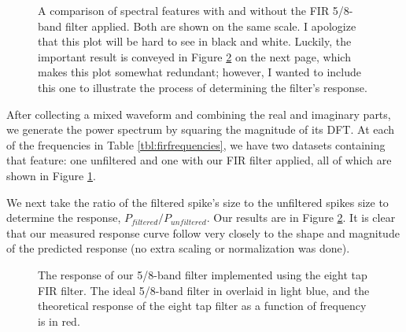 \documentclass[12pt]{article}
\begin{document}
\begin{figure}[H]
\caption[SODUMB]{A comparison of spectral features with and without the FIR 5/8-band filter applied. Both are shown on the same scale. I apologize that this plot will be hard to see in black and white. Luckily, the important result is conveyed in Figure \ref{fig:firresponse} on the next page, which makes this plot somewhat redundant; however, I wanted to include this one to illustrate the process of determining the filter's response.}
\label{fig:fircompare}
\end{figure}

After collecting a mixed waveform and combining the real and imaginary parts, we generate the power spectrum by squaring the magnitude of its DFT. At each of the frequencies in Table \ref{tbl:firfrequencies}, we have two datasets containing that feature: one unfiltered and one with our FIR filter applied, all of which are shown in Figure \ref{fig:fircompare}.

We next take the ratio of the filtered spike's size to the unfiltered spikes size to determine the response, $P_{filtered} / P_{unfiltered}$. Our results are in Figure \ref{fig:firresponse}. It is clear that our measured response curve follow very closely to the shape and magnitude of the predicted response (no extra scaling or normalization was done).

\begin{figure}[H]
\caption[SODUMB]{The response of our 5/8-band filter implemented using the eight tap FIR filter. The ideal 5/8-band filter in overlaid in light blue, and the theoretical response of the eight tap filter as a function of frequency is in red.}
\label{fig:firresponse}
\end{figure}
\end{document}
